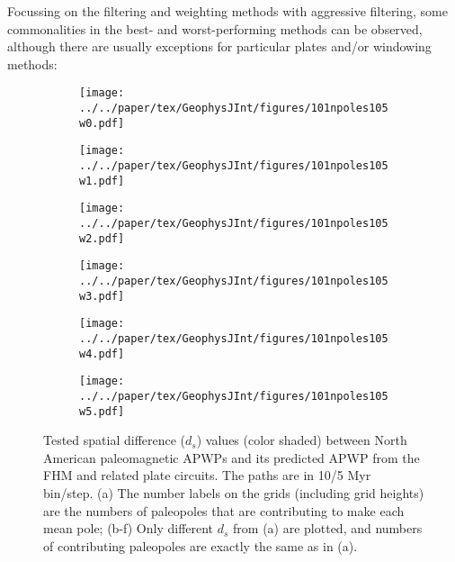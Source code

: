 Focussing on the filtering and weighting methods with aggressive filtering,
some commonalities in the best- and worst-performing methods can be observed,
although there are usually exceptions for particular plates and/or windowing
methods:
%
\begin{figure}[!ht]
  \captionsetup[subfigure]{singlelinecheck=off,justification=raggedright,aboveskip=-6pt,belowskip=-6pt}
  \centering
  \begin{subfigure}{.495\textwidth}
    \texttt{[image: ../../paper/tex/GeophysJInt/figures/101npoles105w0.pdf]}
    \caption{}\label{fig-na-dsw0}
  \end{subfigure}
  \vspace{.1em}
  \begin{subfigure}{.495\textwidth}
    \texttt{[image: ../../paper/tex/GeophysJInt/figures/101npoles105w1.pdf]}
    \caption{}\label{fig-na-dsw1}
  \end{subfigure}
  \vspace{.1em}
  \begin{subfigure}{.495\textwidth}
    \texttt{[image: ../../paper/tex/GeophysJInt/figures/101npoles105w2.pdf]}
    \caption{}\label{fig-na-dsw2}
  \end{subfigure}
  \vspace{.1em}
  \begin{subfigure}{.495\textwidth}
    \texttt{[image: ../../paper/tex/GeophysJInt/figures/101npoles105w3.pdf]}
    \caption{}\label{fig-na-dsw3}
  \end{subfigure}
  \vspace{.1em}
  \begin{subfigure}{.495\textwidth}
    \texttt{[image: ../../paper/tex/GeophysJInt/figures/101npoles105w4.pdf]}
    \caption{}\label{fig-na-dsw4}
  \end{subfigure}
  \vspace{.1em}
  \begin{subfigure}{.495\textwidth}
    \texttt{[image: ../../paper/tex/GeophysJInt/figures/101npoles105w5.pdf]}
    \caption{}\label{fig-na-dsw5}
  \end{subfigure}
  \caption[$d_s$ of each pair of poles for North American 10/5 Myr APWPs]{Tested
    spatial difference ($d_s$) values (color shaded) between North American
    paleomagnetic APWPs and its predicted APWP from the FHM and related plate
    circuits. The paths are in 10/5 Myr bin/step. (a) The number labels on the
    grids (including grid heights) are the numbers of paleopoles that are
    contributing to make each mean pole; (b-f) Only different $d_s$ from (a) are
    plotted, and numbers of contributing paleopoles are exactly the same as in
    (a).}\label{fig-nads}
\end{figure}

